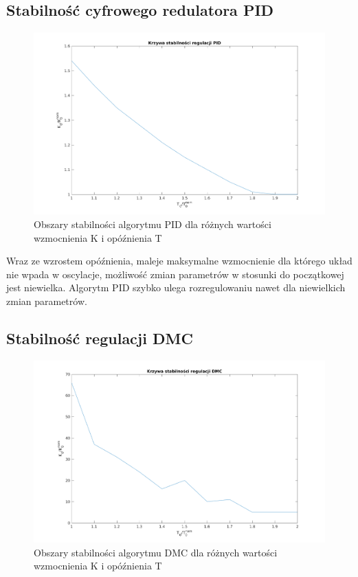 \documentclass[a4paper, 11pt]{article}
\begin{document}
 
\subsection{Stabilność cyfrowego redulatora PID}
\begin{figure}[H]
\centering
\includegraphics[scale=0.60]{pid_stability.png}
\caption{Obszary stabilności algorytmu PID dla różnych wartości wzmocnienia K i opóźnienia T}
\label{}
\end{figure}
Wraz ze wzrostem opóźnienia, maleje maksymalne wzmocnienie dla którego układ nie wpada w oscylacje, możliwość zmian parametrów w stosunki do początkowej jest niewielka. Algorytm PID szybko ulega rozregulowaniu nawet dla niewielkich zmian parametrów. 
 
\subsection{Stabilność regulacji DMC}
\begin{figure}[H]
\centering
\includegraphics[scale=0.60]{DMC_stability.png}
\caption{Obszary stabilności algorytmu DMC dla różnych wartości wzmocnienia K i opóźnienia T}
\label{}
\end{figure}
\end{document}
